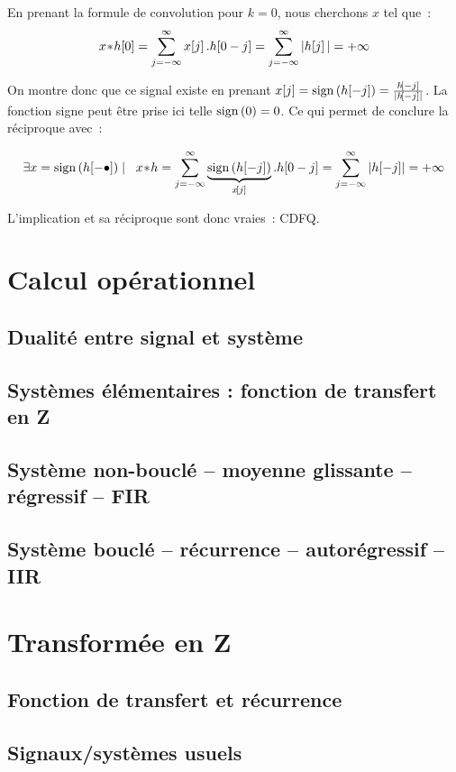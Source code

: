\begin{demo}
\begin{description}
  En prenant la formule de convolution pour $k=0$, nous cherchons $x$ tel que~:
  $$ x\!\ast\! h\!\left[0\right]= \sum\limits_{j=-\infty}^{\infty}{x\!\left[j\right].h\!\left[0-j\right]} =  \sum\limits_{j=-\infty}^{\infty}{|h\!\left[j\right]|} = +\infty$$

  On montre donc que ce signal existe en prenant
  $x[j]=\mathop{\mathrm{sign}}\left(h\!\left[-j\right]\right)=\frac{h\!\left[-j\right]}{\left|h\!\left[-j\right]\right|}$. La
  fonction signe peut être prise ici telle $\mathop{\mathrm{sign}}\left(0\right)=0$.  Ce qui
  permet de conclure la réciproque avec~:

  $$\exists x=\mathop{\mathrm{sign}}\left(h\!\left[-\bullet\right]\right) \mathrel{}\mid\mathrel{} \;\; x\!\ast\! h = \sum\limits_{j=-\infty}^{\infty}{\underbrace{\mathop{\mathrm{sign}}\left(h\!\left[-j\right]\right)}_{x\!\left[j\right]}.h\!\left[0-j\right]}= \sum\limits_{j=-\infty}^{\infty}{\left|h\!\left[-j\right]\right|}=+\infty$$

  L'implication et sa réciproque sont donc vraies~: CDFQ.
  
\end{description}
\end{demo}
\section{Calcul opérationnel}
\subsection{Dualité entre signal et système}
\subsection{Systèmes élémentaires : fonction de transfert en Z }
\subsection{Système non-bouclé -- moyenne glissante -- régressif --  FIR  }
\subsection{Système bouclé -- récurrence -- autorégressif -- IIR}

\section{Transformée en Z}

\subsection{Fonction de transfert et récurrence}
\subsection{Signaux/systèmes usuels}
